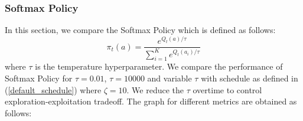 \documentclass{article}
\begin{document}
		
		\subsubsection{Softmax Policy}
		
		In this section, we compare the Softmax Policy which is defined as follows:
		\begin{equation}
		\nonumber
			\pi_{t}(a) = \frac{e^{Q_{t}(a)/\tau}}{\sum_{i=1}^{K} e^{Q_{t}(a_{i})/\tau}}
		\end{equation}
		where $\tau$ is the temperature hyperparameter. We compare the performance of Softmax Policy for $\tau=0.01$, $\tau=10000$ and variable $\tau$ with 
		schedule as defined in (\ref{default_schedule}) where $\zeta=10$. We reduce the $\tau$ overtime to control exploration-exploitation tradeoff. The graph for 
		different metrics are obtained as follows:
		
\end{document}
